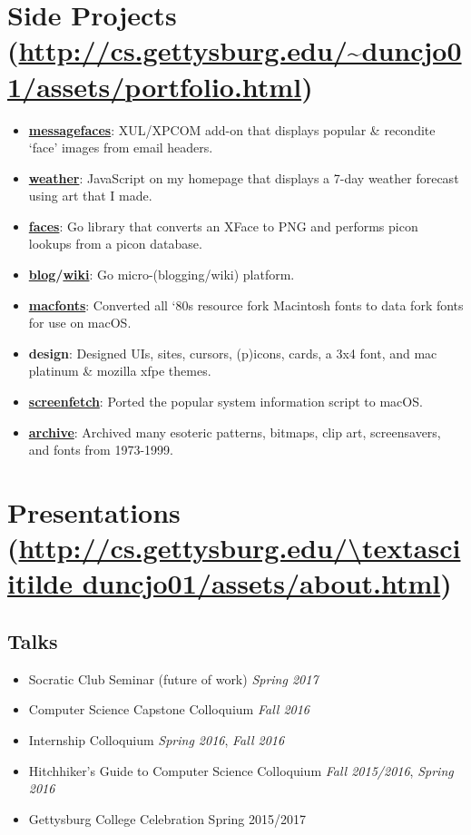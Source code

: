 \documentclass[11pt]{article}
\begin{document}
\section*{Side Projects (\url{http://cs.gettysburg.edu/~duncjo01/assets/portfolio.html})}
\begin{itemize}[noitemsep]
	\item \href{https://github.com/JohnDDuncanIII/MessageFaces}{\textbf{messagefaces}}: XUL/XPCOM add-on that displays popular \& recondite `face' images from email headers.
	\item \href{https://dataswamp.org/~john/assets/scripts/weather.js}{\textbf{weather}}: JavaScript on my homepage that displays a 7-day weather forecast using art that I made.
	\item \href{https://github.com/JohnDDuncanIII/faces}{\textbf{faces}}: Go library that converts an XFace to PNG and performs picon lookups from a picon database.
	\item \textbf{\href{https://github.com/JohnDDuncanIII/blog}{blog}/\href{https://github.com/JohnDDuncanIII/wiki}{wiki}}: Go micro-(blogging/wiki) platform.
	\item \textbf{\href{https://github.com/JohnDDuncanIII/macfonts}{macfonts}}: Converted all `80s resource fork Macintosh fonts to data fork fonts for use on macOS. 
	\item \textbf{design}: Designed UIs, sites, cursors, (p)icons, cards, a 3x4 font, and mac platinum \& mozilla xfpe themes.
	\item \href{https://github.com/KittyKatt/screenFetch/blob/master/screenfetch.1\#L126}{\textbf{screenfetch}}: Ported the popular system information script to macOS.
	\item \href{http://cs.gettysburg.edu/~duncjo01/archive/}{\textbf{archive}}: Archived many esoteric patterns, bitmaps, clip art, screensavers, and fonts from 1973-1999.
\end{itemize}

\section*{Presentations (\url{http://cs.gettysburg.edu/\textasciitilde duncjo01/assets/about.html})}
\subsection*{Talks}
\begin{itemize}[noitemsep]
	\item Socratic Club Seminar (future of work) \hfill \textit{Spring 2017}
	\item Computer Science Capstone Colloquium \hfill \textit{Fall 2016}
	\item Internship Colloquium \hfill \textit{Spring 2016}, \textit{Fall 2016}
	\item Hitchhiker's Guide to Computer Science Colloquium \hfill \textit{Fall 2015/2016}, \textit{Spring 2016}
	\item Gettysburg College Celebration \hfill Spring 2015/2017
\end{itemize}
\end{document}
